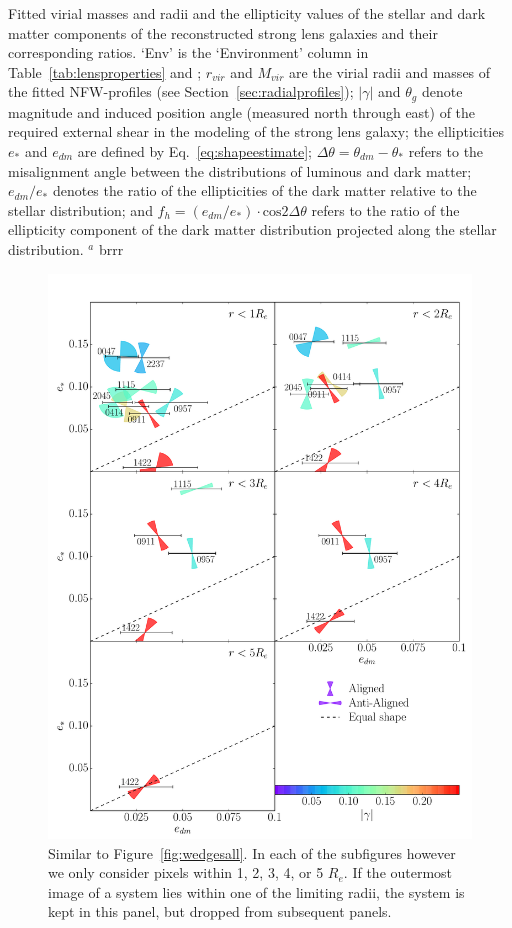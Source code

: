 \documentclass[useAMS,usenatbib]{mn2e}
\begin{document}
\begin{table}
\begin{center}
    \caption{Fitted virial masses and radii and the ellipticity values of the stellar and dark matter components of the reconstructed strong lens galaxies and their corresponding ratios. `Env' is the `Environment' column in Table~\ref{tab:lensproperties} and ; $r_{vir}$ and $M_{vir}$ are the virial radii and masses of the fitted NFW-profiles (see Section~\ref{sec:radialprofiles}); $|\gamma|$ and $\theta_{g}$ denote magnitude and induced position angle (measured north through east) of the required external shear in the modeling of the strong lens galaxy; the ellipticities $e_{*}$ and $e_{dm}$ are defined by Eq.~\ref{eq:shapeestimate}; $\Delta\theta=\theta_{dm}-\theta_{*}$ refers to the misalignment angle between the distributions of luminous and dark matter; $e_{dm}/e_{*}$ denotes the ratio of the ellipticities of the dark matter relative to the stellar distribution; and $f_h=(e_{dm}/e_{*})\cdot\mathrm{cos} 2\Delta\theta$ refers to the ratio of the ellipticity component of the dark matter distribution projected along the stellar distribution. \newline $^{a}$ brrr}
    \label{tab:ellipratios}
  \end{center}
\end{table}

\begin{figure}
  \centering
  \includegraphics[width=.75\linewidth]{Figures/wedges.pdf}
  \caption[width=\linewidth]{Similar to Figure~\ref{fig:wedgesall}. In each of the subfigures however we only consider pixels within 1, 2, 3, 4, or 5 $R_e$. If the outermost image of a system lies within one of the limiting radii, the system is kept in this panel, but dropped from subsequent panels.}
  \label{fig:wedgesradii}
\end{figure}
\end{document}
